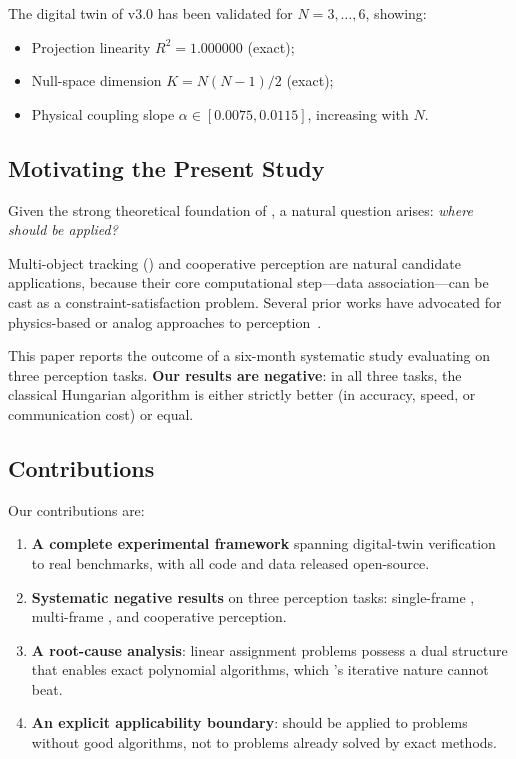 The digital twin of \abnqss v3.0 has been validated for 
$N = 3, \dots, 6$, showing:
\begin{itemize}[leftmargin=*]
    \item Projection linearity $R^2 = 1.000000$ (exact);
    \item Null-space dimension $K = N(N-1)/2$ (exact);
    \item Physical coupling slope $\alpha \in [0.0075, 0.0115]$, 
          increasing with $N$.
\end{itemize}

\subsection{Motivating the Present Study}

Given the strong theoretical foundation of \ZSP, a natural question 
arises: \emph{where should \ZSP be applied?} 

Multi-object tracking (\MOT) and cooperative perception are natural 
candidate applications, because their core computational step---data 
association---can be cast as a constraint-satisfaction problem. Several 
prior works have advocated for physics-based or analog approaches to 
perception~\cite{...}. 

This paper reports the outcome of a six-month systematic study 
evaluating \ZSP on three perception tasks. \textbf{Our results are 
negative}: in all three tasks, the classical Hungarian algorithm 
is either strictly better (in accuracy, speed, or communication 
cost) or equal. 

\subsection{Contributions}

Our contributions are:
\begin{enumerate}[leftmargin=*]
    \item \textbf{A complete experimental framework} spanning 
          digital-twin verification to real benchmarks, with 
          all code and data released open-source.
    \item \textbf{Systematic negative results} on three perception 
          tasks: single-frame \MOT, multi-frame \MOT, and 
          cooperative perception.
    \item \textbf{A root-cause analysis}: linear assignment problems 
          possess a dual structure that enables exact polynomial 
          algorithms, which \ZSP's iterative nature cannot beat.
    \item \textbf{An explicit applicability boundary}: \ZSP should 
          be applied to problems without good algorithms, not to 
          problems already solved by exact methods.
\end{enumerate}


